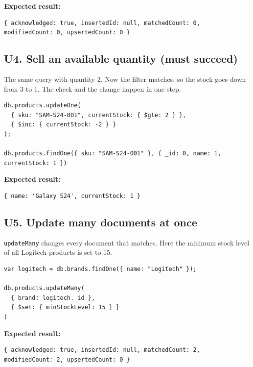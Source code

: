 \documentclass[11pt,a4paper]{article}
\newcommand{\code}[1]{\texttt{#1}}
\begin{document}
\noindent\textbf{Expected result:}
\begin{lstlisting}[style=result]
{ acknowledged: true, insertedId: null, matchedCount: 0, modifiedCount: 0, upsertedCount: 0 }
\end{lstlisting}

\subsection*{U4. Sell an available quantity (must succeed)}
The same query with quantity 2. Now the filter matches, so the stock goes down from 3 to 1. The check and the change happen in one step.

\begin{minipage}{\linewidth}
\begin{lstlisting}[style=query]
db.products.updateOne(
  { sku: "SAM-S24-001", currentStock: { $gte: 2 } },
  { $inc: { currentStock: -2 } }
);

db.products.findOne({ sku: "SAM-S24-001" }, { _id: 0, name: 1, currentStock: 1 })
\end{lstlisting}
\end{minipage}

\noindent\textbf{Expected result:}
\begin{lstlisting}[style=result]
{ name: 'Galaxy S24', currentStock: 1 }
\end{lstlisting}

\subsection*{U5. Update many documents at once}
\code{updateMany} changes every document that matches. Here the minimum stock level of all Logitech products is set to 15.

\begin{minipage}{\linewidth}
\begin{lstlisting}[style=query]
var logitech = db.brands.findOne({ name: "Logitech" });

db.products.updateMany(
  { brand: logitech._id },
  { $set: { minStockLevel: 15 } }
)
\end{lstlisting}
\end{minipage}

\noindent\textbf{Expected result:}
\begin{lstlisting}[style=result]
{ acknowledged: true, insertedId: null, matchedCount: 2, modifiedCount: 2, upsertedCount: 0 }
\end{lstlisting}
\end{document}
